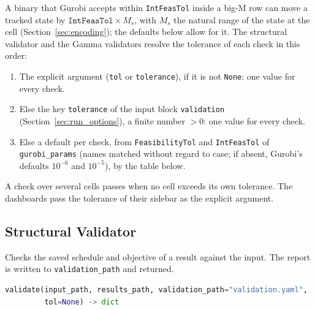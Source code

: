 A binary that Gurobi accepts within \texttt{IntFeasTol} inside a big-M row can move a tracked state by $\texttt{IntFeasTol} \times M_s$, with $M_s$ the natural range of the state at the cell (Section~\ref{sec:encoding}); the defaults below allow for it.
The structural validator and the Gamma validators resolve the tolerance of each check in this order:
\begin{enumerate}[nosep,label=\arabic*.]
  \item The explicit argument (\texttt{tol} or \texttt{tolerance}), if it is not \texttt{None}: one value for every check.
  \item Else the key \texttt{tolerance} of the input block \texttt{validation} (Section~\ref{sec:run_options}), a finite number $> 0$: one value for every check.
  \item Else a default per check, from \texttt{FeasibilityTol} and \texttt{IntFeasTol} of \texttt{gurobi\_params} (names matched without regard to case; if absent, Gurobi's defaults $10^{-6}$ and $10^{-5}$), by the table below.
\end{enumerate}

\tabend

A check over several cells passes when no cell exceeds its own tolerance.
The dashboards pass the tolerance of their sidebar as the explicit argument.

\subsection{Structural Validator}
\label{sec:validation_structural}

Checks the saved schedule and objective of a result against the input. The report is written to \texttt{validation\_path} and returned.

\begin{lstlisting}[language=Python]
validate(input_path, results_path, validation_path="validation.yaml",
         tol=None) -> dict
\end{lstlisting}

\tabend

